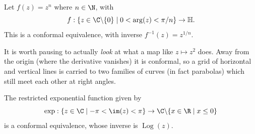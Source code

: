 \begin{example}
    Let $f(z) = z^n$ where $n \in \N$, with
    $$
    f: \{z \in \C \backslash \{0\} \mid 0 < \arg(z) < \pi/n\} \rightarrow \mathbb{H}.
    $$
    This is a conformal equivalence, with inverse $f^{-1}(z) = z^{1/n}$.
\end{example}

It is worth pausing to actually \emph{look} at what a map like $z \mapsto z^2$ does. Away from the origin (where the derivative vanishes) it is conformal, so a grid of horizontal and vertical lines is carried to two families of curves (in fact parabolas) which still meet each other at right angles.

\begin{center}
\end{center}

\begin{example}
The restricted exponential function given by
$$
\exp: \{z \in \C \mid -\pi < \im (z) < \pi\} \rightarrow \C \backslash \{x \in \R \mid x \leq 0\}
$$
is a conformal equivalence, whose inverse is $\operatorname{Log}(z)$.
\end{example}


